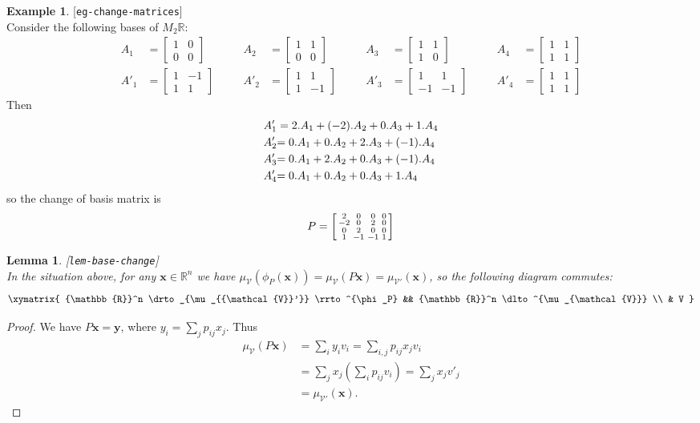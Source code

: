\documentclass{amsart}
\newcommand{\lbl}[1]{\label{#1}\textup{[\texttt{#1}]}\ \\}
\newcommand{\lbl}{\label}
\newcommand{\R}         {{\mathbb{R}}}
\newcommand{\bsm}       {\left[\begin{smallmatrix}}
\newcommand{\esm}       {\end{smallmatrix}\right]}
\newcommand{\vx}        {\mathbf{x}}
\newcommand{\vy}        {\mathbf{y}}
\newcommand{\CV}        {{\mathcal{V}}}
\renewcommand{\:}       {\colon}
\newtheorem{lemma}[theorem]{Lemma}
\theoremstyle{definition}
\newtheorem{example}[theorem]{Example}
\begin{document}
\begin{example}\lbl{eg-change-matrices}
 {Consider the following bases of $M_2\R$:
 {\small \[ \begin{array}{rlcrlcrlcrl}
     A_1  &= \bsm 1&0\\0&0\esm &\hspace{1em}&
     A_2  &= \bsm 1&1\\0&0\esm &\hspace{1em}&
     A_3  &= \bsm 1&1\\1&0\esm &\hspace{1em}&
     A_4  &= \bsm 1&1\\1&1\esm \\
     {A'_1} &{=\bsm 1&-1\\1&1\esm}  &\hspace{1em}&
     {A'_2} &{=\bsm 1&1\\1&-1\esm}  &\hspace{1em}&
     {A'_3} &{=\bsm 1&1\\-1&-1\esm} &\hspace{1em}&
     {A'_4} &{=\bsm 1&1\\1&1\esm}
    \end{array}
 \]}}
 {Then
 \begin{align*}
  A'_1 &= {2}.A_1 + {(-2)}.A_2 + {0}.A_3 + {1}.A_4 \\
  {A'_2} &{= {0}.A_1 + {0}.A_2 + {2}.A_3 + {(-1)}.A_4} \\
  {A'_3} &{= {0}.A_1 + {2}.A_2 + {0}.A_3 + {(-1)}.A_4} \\
  {A'_4} &{= {0}.A_1 + {0}.A_2 + {0}.A_3 + {1}.A_4}
 \end{align*}} {so the change of basis matrix is
 \[ P = \bsm 
     \RED{ 2} & \OLG{ 0} & \BLUE{ 0} & \ORANGE{0} \\
     \RED{-2} & \OLG{ 0} & \BLUE{ 2} & \ORANGE{0} \\
     \RED{ 0} & \OLG{ 2} & \BLUE{ 0} & \ORANGE{0} \\
     \RED{ 1} & \OLG{-1} & \BLUE{-1} & \ORANGE{1} 
    \esm
 \]}
\end{example}



\begin{lemma}\lbl{lem-base-change}
 In the situation above, for any $\vx\in\R^n$ we have
 $\mu_\CV(\phi_P(\vx))=\mu_\CV(P\vx)=\mu_{\CV'}(\vx)$, so
 the following diagram commutes:
 \[ \xymatrix{
  \R^n \drto_{\mu_{\CV'}} \rrto ^{\phi_P} &&
  \R^n \dlto^{\mu_\CV} \\ & V
 }\]
\end{lemma}
\begin{proof}
 We have $P\vx=\vy$, where $y_i=\sum_jp_{ij}x_j$.
 Thus 
 \begin{align*}
  \mu_{\CV}(P\vx) &=
   \sum_i y_i v_i = \sum_{i,j} p_{ij}x_j v_i \\
   &= \sum_j x_j \left(\sum_i p_{ij}v_i\right)
    = \sum_j x_j v'_j \\
   &= \mu_{\CV'}(\vx).
 \end{align*}
\end{proof}
\end{document}
